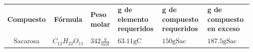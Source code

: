 \begin{table}\centering
    \caption{}
    \label{tab:}
    {\tabstyle
    \begin{tabular}{cc}\hline
        \textbf{Compuesto} & \textbf{Fórmula} & \textbf{Peso molar} & \textbf{g de elemento requeridos} & \textbf{g de compuesto requeridos} & \textbf{g de compuesto en exceso} \\
    
    Sacarosa & $C_{12}H_{22}O_{11}$ & $342 \frac{g}{mol}$ & $63.11\text{gC}$ & $150\text{gSac}$ & $187.5\text{gSac}$ \\
    \hline\end{tabular}}
\end{table}